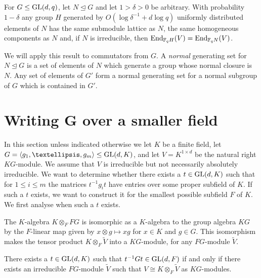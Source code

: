\begin{Cor}  \label{cor:right_action}
For $G \leq \GL(d, q)$, let $N \unlhd G$ and let $1 > \delta > 0$ 
be arbitrary. With probability $1-\delta$ 
any group $H$ generated by $O(\log \delta^{-1} + d \log q)$ 
uniformly distributed elements of $N$ 
has the same submodule lattice as $N$, the same homogeneous components as $N$
and, if $N$ is irreducible, then $\End_{\F_q H}(V) = \End_{\F_q N}(V)$.
\end{Cor}

We will apply this result to commutators from $G$. A \emph{normal} generating set for $N \unlhd G$ is a set of elements of $N$
which generate a group whose normal closure is $N$. 
 Any set of elements of $G'$ form a normal 
generating set for a normal subgroup of $G$ which is contained in $G'$. 


\section{Writing $\mathbf{G}$ over a smaller field}
\label{realisesubfield}

In this section unless indicated otherwise we let $K$ be a finite field, let
 $G = \langle g_1, \ldots, g_m \rangle \leq \GL(d, K)$, 
and let $V = K^{1 \times d}$ be the natural right
$KG$-module. We assume that $V$ is irreducible but not necessarily
absolutely irreducible. We want to determine whether there exists
 a $t \in \GL(d,K)$ such that for
$1 \le i \le m$ the matrices
$t^{-1}g_it$  have entries over some proper subfield of $K$. 
If such a $t$ exists, we want to construct it for 
the smallest possible subfield $F$ of $K$. 
We first
analyse when such a $t$ exists.



The $K$-algebra $K \otimes_F FG$ is isomorphic  as a $K$-algebra to
the group algebra $KG$ by the $F$-linear map given by $x \otimes g \mapsto xg$ 
for $x \in K$ and $g \in G$. This isomorphism makes the tensor
product $K \otimes_F \tilde V$ into
a $KG$-module,  for any $FG$-module $\tilde V$. 

\begin{Lemm}
\label{extsca}
There exists a $t \in \GL(d,K)$ such that $t^{-1}Gt \in \GL(d,F)$
if and only if there exists an irreducible $F G$-module 
$\tilde{V}$
such that $V \cong K \otimes_{F} \tilde{V}$ as $KG$-modules.
\end{Lemm}

